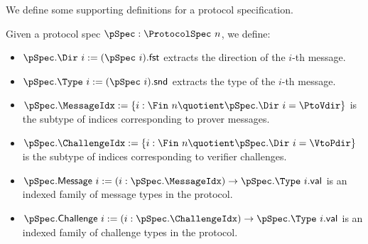 We define some supporting definitions for a protocol specification.

\begin{definition}
    \label{def:protocol_spec_components}
    Given a protocol spec \(\pSpec : \ProtocolSpec\ n\), we define:
    \begin{itemize}
        \item \(\pSpec.\Dir\ i := (\pSpec\ i).\mathsf{fst}\) extracts the direction of the \(i\)-th message.
        \item \(\pSpec.\Type\ i := (\pSpec\ i).\mathsf{snd}\) extracts the type of the \(i\)-th message.
        \item \(\pSpec.\MessageIdx := \{i : \Fin\ n \quotient \pSpec.\Dir\ i = \PtoVdir\}\) is the subtype of indices corresponding to prover messages.
        \item \(\pSpec.\ChallengeIdx := \{i : \Fin\ n \quotient \pSpec.\Dir\ i = \VtoPdir\}\) is the subtype of indices corresponding to verifier challenges.
        \item \(\pSpec.\mathsf{Message}\ i := (i : \pSpec.\MessageIdx) \to \pSpec.\Type\ i.\mathsf{val}\) is an indexed family of message types in the protocol.
        \item \(\pSpec.\mathsf{Challenge}\ i := (i : \pSpec.\ChallengeIdx) \to \pSpec.\Type\ i.\mathsf{val}\) is an indexed family of challenge types in the protocol.
    \end{itemize}
    \leanok
\end{definition}

